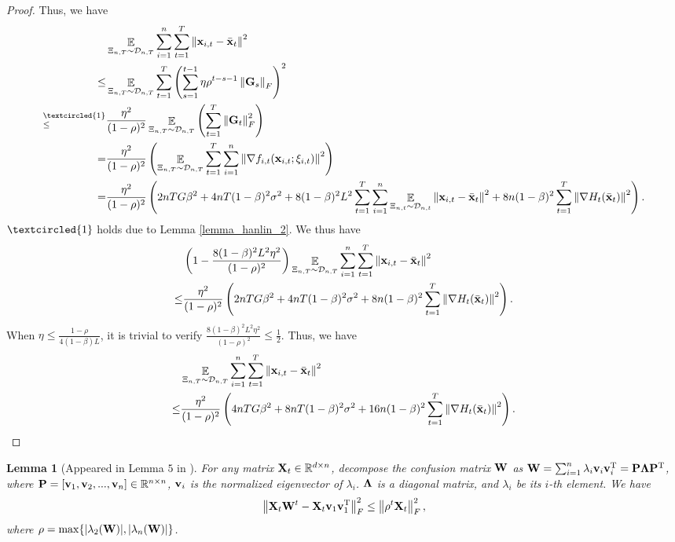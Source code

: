 \documentclass{article}
\newtheorem{Lemma}{\bf{Lemma}}
\begin{document}
\begin{proof}
Thus, we  have
\begin{align}
\nonumber
& \EE_{ \Xi_{n,T} \sim \Dcal_{n,T} } \sum_{i=1}^n\sum_{t=1}^T \lrnorm{\x_{i,t} - \bar{\x}_t}^2  \\ \nonumber 
\le & \EE_{ \Xi_{n,T} \sim \Dcal_{n,T} } \sum_{t=1}^T \lrincir{ \sum_{s=1}^{t-1} \eta \rho^{t-s-1} \lrnorm{\G_s}_F}^2  \\ \nonumber
\refabovecir{\le}{\textcircled{1}} & \frac{\eta^2}{(1-\rho)^2} \EE_{ \Xi_{n,T} \sim \Dcal_{n,T} } \lrincir{  \sum_{t=1}^T \lrnorm{\G_t}_F^2 } \\ \nonumber
= & \frac{\eta^2}{(1-\rho)^2} \lrincir{ \EE_{ \Xi_{n,T} \sim \Dcal_{n,T} } \sum_{t=1}^T \sum_{i=1}^n  \lrnorm{\nabla f_{i,t}(\x_{i,t}; \xi_{i,t})}^2 } \\ \nonumber
= & \frac{\eta^2}{(1-\rho)^2} \lrincir{ 2nTG\beta^2  +  4nT(1-\beta)^2 \sigma^2 +  8(1-\beta)^2 L^2 \sum_{t=1}^T \sum_{i=1}^n \EE_{ \Xi_{n,t} \sim \Dcal_{n,t} }\lrnorm{ \x_{i,t} - \bar{\x}_t }^2 + 8n(1-\beta)^2 \sum_{t=1}^T \lrnorm{\nabla H_t(\bar{\x}_t)}^2 }.
\end{align} $\textcircled{1}$ holds due to Lemma \ref{lemma_hanlin_2}. 
We thus have
\begin{align}
\nonumber
& \left(  1 - \frac{8(1-\beta)^2L^2\eta^2}{(1-\rho)^2}  \right)\mathop{\mathbb{E}}_{ \Xi_{n,T} \sim \mathcal{D}_{n,T} } \sum_{i=1}^n\sum_{t=1}^T \left\lVert{\bf x}_{i,t} - \bar{{\bf x}}_t\right\rVert^2 \\ \nonumber 
\le & \frac{\eta^2}{(1-\rho)^2} \left(  2nTG\beta^2  +  4nT(1-\beta)^2 \sigma^2 + 8n(1-\beta)^2 \sum_{t=1}^T \left\lVert\nabla H_t(\bar{{\bf x}}_t)\right\rVert^2  \right).
\end{align} When $\eta \le \frac{1-\rho}{4(1-\beta)L}$, it is trivial to verify $\frac{8(1-\beta)^2L^2\eta^2}{(1-\rho)^2} \le \frac{1}{2}$. Thus, we have
\begin{align}
\nonumber
& \mathop{\mathbb{E}}_{ \Xi_{n,T} \sim \mathcal{D}_{n,T} } \sum_{i=1}^n\sum_{t=1}^T \left\lVert{\bf x}_{i,t} - \bar{{\bf x}}_t\right\rVert^2 \\ \nonumber 
\le & \frac{\eta^2}{(1-\rho)^2} \left(  4nTG\beta^2  +  8nT(1-\beta)^2 \sigma^2 + 16n(1-\beta)^2 \sum_{t=1}^T \left\lVert\nabla H_t(\bar{{\bf x}}_t)\right\rVert^2  \right).
\end{align}



\end{proof}








\begin{Lemma}[Appeared in Lemma $5$ in \citep{Tang:2018un}]
\label{lemma_hanlin_1}
For any matrix ${\bf X}_t\in\mathbb{R}^{d\times n}$, decompose the confusion matrix ${\bf W}$ as ${\bf W} = \sum_{i=1}^n \lambda_i {\bf v}_i {\bf v}_i^{\rm T} = {\bf P} \mathbf{\Lambda} {\bf P}^{\rm T}$, where ${\bf P} = [{\bf v}_1, {\bf v}_2, ..., {\bf v}_n]\in\mathbb{R}^{n\times n}$, ${\bf v}_i$ is the normalized eigenvector of $\lambda_i$. $\mathbf{\Lambda}$ is a diagonal matrix, and $\lambda_i$ be its $i$-th element. We have
\begin{align}
\nonumber
\left\lVert{\bf X}_t {\bf W}^t - {\bf X}_t {\bf v}_1 {\bf v}_1^{\rm T} \right\rVert_F^2 \le \left\lVert\rho^t {\bf X}_t\right\rVert_F^2, 
\end{align} where  $\rho = \max \{| \lambda_2({\bf W}) |, | \lambda_n({\bf W}) |\}$. 

\end{Lemma}
\end{document}
